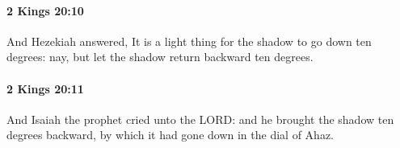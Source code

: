 		\paragraph{2 Kings 20:10} %
			\label{2KINGS-20-10}

			And Hezekiah answered, It is a light thing for the shadow to go down ten degrees: nay, but let the shadow return backward ten degrees.


		\paragraph{2 Kings 20:11} %
			\label{2KINGS-20-11}

			And Isaiah the prophet cried unto the LORD: and he brought the shadow ten degrees backward, by which it had gone down in the dial of Ahaz.



